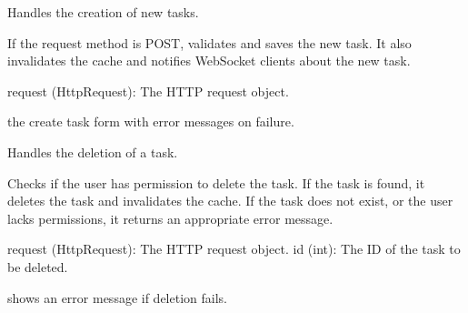 \documentclass[letterpaper,10pt,english]{sphinxmanual}
\begin{document}
\begin{fulllineitems}
\label{\detokenize{tasks:tasks.views.create_task}}
\pysigstartsignatures
{}
\pysigstopsignatures
\sphinxAtStartPar
Handles the creation of new tasks.

\sphinxAtStartPar
If the request method is POST, validates and saves the new task. 
It also invalidates the cache and notifies WebSocket clients about the new task.
\begin{description}
\sphinxAtStartPar
request (HttpRequest): The HTTP request object.

\begin{description}
\sphinxAtStartPar
the create task form with error messages on failure.

\end{description}

\end{description}

\end{fulllineitems}


\begin{fulllineitems}
\label{\detokenize{tasks:tasks.views.delete_task}}
\pysigstartsignatures
{}
\pysigstopsignatures
\sphinxAtStartPar
Handles the deletion of a task.

\sphinxAtStartPar
Checks if the user has permission to delete the task. If the task is found, 
it deletes the task and invalidates the cache. If the task does not exist, 
or the user lacks permissions, it returns an appropriate error message.
\begin{description}
\sphinxAtStartPar
request (HttpRequest): The HTTP request object.
id (int): The ID of the task to be deleted.

\begin{description}
\sphinxAtStartPar
shows an error message if deletion fails.

\end{description}

\end{description}

\end{fulllineitems}
\end{document}
